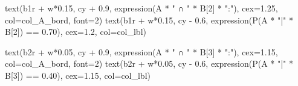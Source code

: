 \documentclass[
  letterpaper,
  DIV=11,
  numbers=noendperiod]{scrartcl}
\newenvironment{Shaded}{\begin{snugshade}}{\end{snugshade}}
\newcommand{\AttributeTok}[1]{\textcolor[rgb]{0.40,0.45,0.13}{#1}}
\newcommand{\DecValTok}[1]{\textcolor[rgb]{0.68,0.00,0.00}{#1}}
\newcommand{\FloatTok}[1]{\textcolor[rgb]{0.68,0.00,0.00}{#1}}
\newcommand{\FunctionTok}[1]{\textcolor[rgb]{0.28,0.35,0.67}{#1}}
\newcommand{\NormalTok}[1]{\textcolor[rgb]{0.00,0.23,0.31}{#1}}
\newcommand{\SpecialCharTok}[1]{\textcolor[rgb]{0.37,0.37,0.37}{#1}}
\newcommand{\StringTok}[1]{\textcolor[rgb]{0.13,0.47,0.30}{#1}}
\begin{document}
\begin{Shaded}
\begin{Highlighting}[]
\FunctionTok{text}\NormalTok{(b1r }\SpecialCharTok{+}\NormalTok{ w}\SpecialCharTok{*}\FloatTok{0.15}\NormalTok{, cy }\SpecialCharTok{+} \FloatTok{0.9}\NormalTok{, }\FunctionTok{expression}\NormalTok{(A }\SpecialCharTok{*} \StringTok{" ∩ "} \SpecialCharTok{*}\NormalTok{ B[}\DecValTok{2}\NormalTok{] }\SpecialCharTok{*} \StringTok{":"}\NormalTok{), }\AttributeTok{cex=}\FloatTok{1.25}\NormalTok{, }\AttributeTok{col=}\NormalTok{col\_A\_bord, }\AttributeTok{font=}\DecValTok{2}\NormalTok{)}
\FunctionTok{text}\NormalTok{(b1r }\SpecialCharTok{+}\NormalTok{ w}\SpecialCharTok{*}\FloatTok{0.15}\NormalTok{, cy }\SpecialCharTok{{-}} \FloatTok{0.6}\NormalTok{, }\FunctionTok{expression}\NormalTok{(}\FunctionTok{P}\NormalTok{(A }\SpecialCharTok{*} \StringTok{"|"} \SpecialCharTok{*}\NormalTok{ B[}\DecValTok{2}\NormalTok{]) }\SpecialCharTok{==} \FloatTok{0.70}\NormalTok{), }\AttributeTok{cex=}\FloatTok{1.2}\NormalTok{, }\AttributeTok{col=}\NormalTok{col\_lbl)}

\FunctionTok{text}\NormalTok{(b2r }\SpecialCharTok{+}\NormalTok{ w}\SpecialCharTok{*}\FloatTok{0.05}\NormalTok{, cy }\SpecialCharTok{+} \FloatTok{0.9}\NormalTok{, }\FunctionTok{expression}\NormalTok{(A }\SpecialCharTok{*} \StringTok{" ∩ "} \SpecialCharTok{*}\NormalTok{ B[}\DecValTok{3}\NormalTok{] }\SpecialCharTok{*} \StringTok{":"}\NormalTok{), }\AttributeTok{cex=}\FloatTok{1.15}\NormalTok{, }\AttributeTok{col=}\NormalTok{col\_A\_bord, }\AttributeTok{font=}\DecValTok{2}\NormalTok{)}
\FunctionTok{text}\NormalTok{(b2r }\SpecialCharTok{+}\NormalTok{ w}\SpecialCharTok{*}\FloatTok{0.05}\NormalTok{, cy }\SpecialCharTok{{-}} \FloatTok{0.6}\NormalTok{, }\FunctionTok{expression}\NormalTok{(}\FunctionTok{P}\NormalTok{(A }\SpecialCharTok{*} \StringTok{"|"} \SpecialCharTok{*}\NormalTok{ B[}\DecValTok{3}\NormalTok{]) }\SpecialCharTok{==} \FloatTok{0.40}\NormalTok{), }\AttributeTok{cex=}\FloatTok{1.15}\NormalTok{, }\AttributeTok{col=}\NormalTok{col\_lbl)}


\end{Highlighting}
\end{Shaded}
\end{document}
